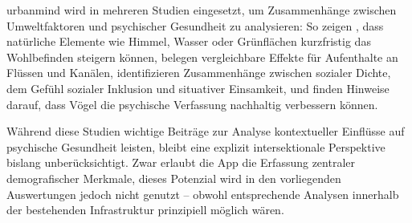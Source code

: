 \gls{urbanmind} wird in mehreren Studien eingesetzt, um Zusammenhänge zwischen Umweltfaktoren und psychischer Gesundheit zu analysieren: So zeigen \textcite{bakolisUrbanMindUsing2018}, dass natürliche Elemente wie Himmel, Wasser oder Grünflächen kurzfristig das Wohlbefinden steigern können, \textcite{bergouMentalHealthBenefits2022} belegen vergleichbare Effekte für Aufenthalte an Flüssen und Kanälen, \textcite{hammoudLonelyCrowdInvestigating2021} identifizieren Zusammenhänge zwischen sozialer Dichte, dem Gefühl sozialer Inklusion und situativer Einsamkeit, und \textcite{hammoudSmartphonebasedEcologicalMomentary2022} finden Hinweise darauf, dass Vögel die psychische Verfassung nachhaltig verbessern können.

Während diese Studien wichtige Beiträge zur Analyse kontextueller Einflüsse auf psychische Gesundheit leisten, bleibt eine explizit intersektionale Perspektive bislang unberücksichtigt. Zwar erlaubt die App die Erfassung zentraler demografischer Merkmale, dieses Potenzial wird in den vorliegenden Auswertungen jedoch nicht genutzt -- obwohl entsprechende Analysen innerhalb der bestehenden Infrastruktur prinzipiell möglich wären.


